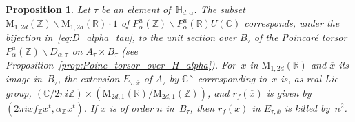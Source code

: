 \documentclass[JEP,XML,SOM,Unicode,NoFloatCountersInSection]{cedram}
\theoremstyle{plain}
\newtheorem{Proposition}[subsection]{Proposition}
\theoremstyle{definition}
\numberwithin{equation}{subsection}
\let\ol\overline
\renewcommand{\C}{\mathbb C}
\newcommand{\R}{\mathbb R}
\newcommand{\Z}{\mathbb Z}
\renewcommand{\H}{\mathbb H}
\newcommand{\rmM}{\mathrm{M}}
\begin{document}
\begin{Proposition}\label{prop_tors_prop_r_f_msv}
Let $\tau$ be an element of~$\H_{d,\alpha}$. The subset
$\rmM_{1,2d}(\Z)\backslash\rmM_{1,2d}(\R){\cdot}1$ of
$P_\alpha^u(\Z)\backslash P_\alpha^u(\R)U(\C)$ corresponds, under
the bijection in~\eqref{eq:D_alpha_tau}, to the unit section over
$B_\tau$ of the Poincaré torsor $P_\alpha^u(\Z)\backslash
D_{\alpha,\tau}$ on $A_\tau\times B_\tau$ (see
Proposition~\ref{prop:Poinc_torsor_over_H_alpha}).
For~$x$ in $\rmM_{1,2d}(\R)$ and
$\ol{x}$ its image in~$B_\tau$, the extension $E_{\tau,\ol{x}}$ of
$A_\tau$ by $\C^\times$ corresponding to~$\ol{x}$ is,
as real Lie group, $(\C/2\pi i\Z)\times(\rmM_{2d,1}(\R)/\rmM_{2d,1}(\Z))$,
and $r_f(\ol{x})$ is given by $(2\pi ixf_\Z x^t, \alpha_\Z x^t)$. If $\ol{x}$ is of
order $n$ in~$B_\tau$, then $r_f(\ol{x})$ in $E_{\tau,\ol{x}}$ is killed by~$n^2$.
\end{Proposition}
\end{document}
